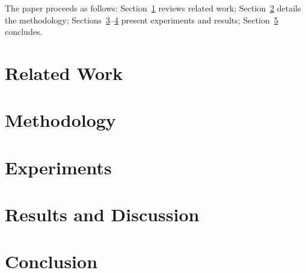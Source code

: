 \documentclass[pdflatex,sn-mathphys-num]{sn-jnl}
\begin{document}
The paper proceeds as follows: Section~\ref{sec:related} reviews related
work; Section~\ref{sec:method} details the methodology;
Sections~\ref{sec:experiments}--\ref{sec:results} present experiments and
results; Section~\ref{sec:conclusion} concludes.

\section{Related Work}
\label{sec:related}

\section{Methodology}
\label{sec:method}

\section{Experiments}
\label{sec:experiments}

\section{Results and Discussion}
\label{sec:results}

\section{Conclusion}
\label{sec:conclusion}


\end{document}
